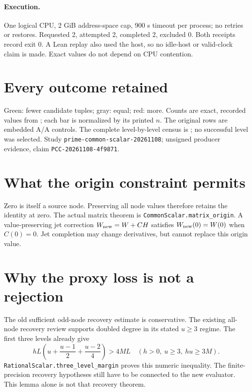 \documentclass[10pt]{article}
\begin{document}
\paragraph{Execution.}
One logical CPU, 2 GiB address-space cap, 900 s timeout per process;
no retries or restores. Requested 2, attempted 2, completed 2, excluded 0.
Both receipts record exit 0. A Lean replay also used the host, so no idle-host
or valid-clock claim is made. Exact values do not depend on CPU contention.

\newpage
\section*{Every outcome retained}
\begin{center}\resizebox{\linewidth}{!}{}\end{center}
Green: fewer candidate tuples; gray: equal; red: more. Counts are exact,
recorded values from ; each bar is normalized by
its printed $n$. The original rows are embedded A/A controls. The complete
level-by-level census is ; no successful level
was selected. Study \texttt{prime-common-scalar-20261108}; unsigned producer
evidence, claim \texttt{PCC-20261108-4f9871}.

\section*{What the origin constraint permits}
Zero is itself a source node. Preserving all node values therefore retains
the identity at zero. The actual matrix theorem is
\texttt{CommonScalar.matrix\_origin}. A value-preserving jet correction
$W_{\rm new}=W+CH$ satisfies $W_{\rm new}(0)=W(0)$ when $C(0)=0$.
Jet completion may change derivatives, but cannot replace this origin value.

\section*{Why the proxy loss is not a rejection}
The old sufficient odd-node recovery estimate is conservative. The existing
all-node recovery review supports doubled degree in its stated $u\ge3$ regime.
The first three levels already give
\[hL\left(u+\frac{u-1}{2}+\frac{u-2}{4}\right)>4ML
 \quad(h>0,\ u\ge3,\ hu\ge3M).\]
\texttt{RationalScalar.three\_level\_margin} proves this numeric inequality.
The finite-precision recovery hypotheses still have to be connected to the
new evaluator. This lemma alone is not that recovery theorem.
\end{document}
